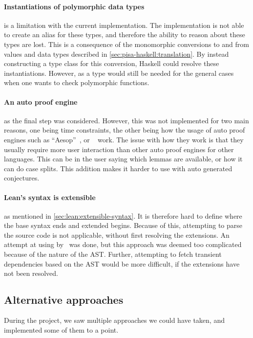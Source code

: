 \paragraph*{Instantiations of polymorphic data types} is a limitation with the current implementation.
The implementation is not able to create an alias for these types, and therefore the ability to reason about these types are lost.
This is a consequence of the monomorphic conversions to and from values and data types described in \cref{sec:pisa-haskell:translation}.
By instead constructing a type class for this conversion, Haskell could resolve these instantiations.
However,  as a type would still be needed for the general cases when one wants to check polymorphic functions.

\paragraph*{An auto proof engine} as the final step was considered.
However, this was not implemented for two main reasons, one being time constraints, the other being how the usage of auto proof engines such as ``Aesop''~\autocite{Aesop}, or ~\autocite{LeanAuto} work.
The issue with how they work is that they usually require more user interaction than other auto proof engines for other languages.
This can be in the user saying which lemmas are available, or how it can do case splits.
This addition makes it harder to use with auto generated conjectures.

\paragraph*{Lean's syntax is extensible} as mentioned in \cref{sec:lean:extensible-syntax}.
It is therefore hard to define where the base syntax ends and extended begins.
Because of this, attempting to parse the source code is not applicable, without first resolving the extensions.
An attempt at using  by~\cite{ast-export} was done, but this approach was deemed too complicated because of the nature of the AST.
Further, attempting to fetch transient dependencies based on the AST would be more difficult, if the extensions have not been resolved.

\subsection{Alternative approaches}\label{sec:discussion:alternative-approaches}
During the project, we saw multiple approaches we could have taken, and implemented some of them to a point.

